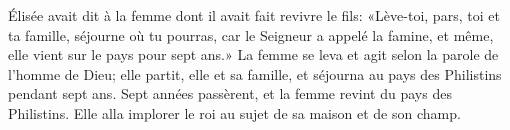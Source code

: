 Élisée avait dit à la femme dont il avait fait revivre le fils:
	«Lève-toi, pars, toi et ta famille, séjourne où tu pourras,
	car le Seigneur a appelé la famine, et même, elle vient sur le pays pour sept ans.»
La femme se leva et agit selon la parole de l’homme de Dieu;
	elle partit, elle et sa famille, et séjourna au pays des Philistins pendant sept ans.
Sept années passèrent, et la femme revint du pays des Philistins.
	Elle alla implorer le roi au sujet de sa maison et de son champ.
